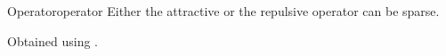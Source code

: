 \begin{definition}{Operator}{operator}
  Either the attractive or the repulsive operator can be sparse.

  Obtained using .
\end{definition}
